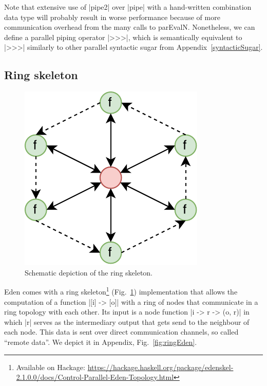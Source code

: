 Note that extensive use of |pipe2| over |pipe| with a hand-written combination data type will probably result in worse performance because of more communication overhead from the many calls to parEvalN. Nonetheless, we can define a parallel piping operator |>>>|, which is semantically equivalent to |>>>| similarly to other parallel syntactic sugar from Appendix~\ref{syntacticSugar}.

\subsection{Ring skeleton} \label{sec:ring}
\begin{figure}[h]
	\includegraphics[scale=0.75]{images/ring}
	\caption{Schematic depiction of the ring skeleton.}
	\label{fig:ringImg}
\end{figure}
Eden comes with a ring skeleton\footnote{Available on Hackage: \url{https://hackage.haskell.org/package/edenskel-2.1.0.0/docs/Control-Parallel-Eden-Topology.html}} (Fig.~\ref{fig:ringImg}) implementation that allows the computation of a function |[i] -> [o]| with a ring of nodes that communicate in a ring topology with each other. Its input is a node function |i -> r -> (o, r)| in which |r| serves as the intermediary output that gets send to the neighbour of each node. This data is sent over direct communication channels, so called \enquote{remote data}. We depict it in Appendix, Fig.~\ref{fig:ringEden}.


